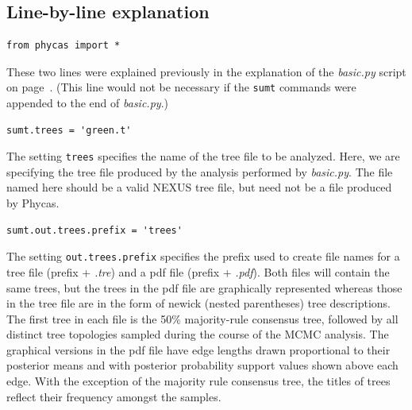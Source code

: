 \documentclass[10pt]{article}
\newcommand{\pathname}[1]{{\em #1}}				%
\newcommand{\code}[1]{{\tt #1}}					%
\newcommand{\opt}[1]{{\tt \small #1}\index{#1}}	%
\begin{document}
\subsection{Line-by-line explanation}
\begin{samepage}
\begin{verbatim}
from phycas import *
\end{verbatim}
These two lines were explained previously in the explanation of the \pathname{basic.py} script on page~\pageref{subsec:basicpyexplanation}. (This line would not be necessary if the \code{sumt} commands were appended to the end of \pathname{basic.py}.)
\end{samepage}

\begin{samepage}
\begin{verbatim}
sumt.trees = 'green.t'
\end{verbatim}
The setting \opt{trees} specifies the name of the tree file to be analyzed. Here, we are specifying the tree file produced by the analysis performed by \pathname{basic.py}. The file named here should be a valid NEXUS tree file, but need not be a file produced by Phycas.
\end{samepage}

\begin{samepage}
\begin{verbatim}
sumt.out.trees.prefix = 'trees'
\end{verbatim}
The setting \opt{out.trees.prefix} specifies the prefix used to create file names for a tree file (prefix + \pathname{.tre}) and a pdf file (prefix + \pathname{.pdf}). Both files will contain the same trees, but the trees in the pdf file are graphically represented whereas those in the tree file are in the form of newick (nested parentheses) tree descriptions. The first tree in each file is the 50\% majority-rule consensus tree, followed by all distinct tree topologies sampled during the course of the MCMC analysis. The graphical versions in the pdf file have edge lengths drawn proportional to their posterior means and with posterior probability support values shown above each edge. With the exception of the majority rule consensus tree, the titles of trees reflect their frequency amongst the samples. 
\end{samepage}
\end{document}
